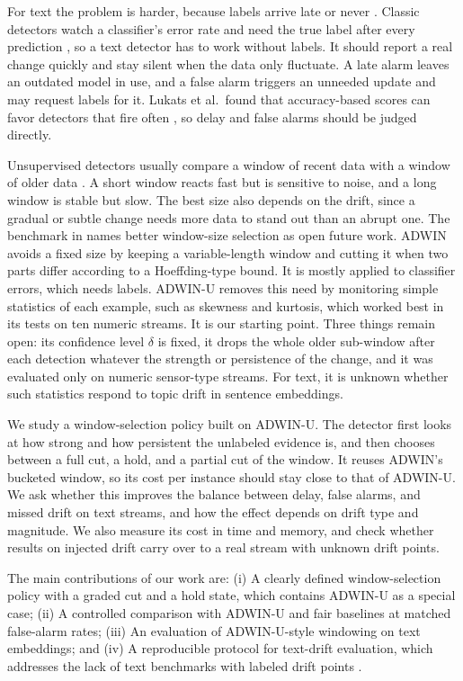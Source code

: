 \documentclass[conference]{IEEEtran}
\begin{document}
For text the problem is harder, because labels arrive late or never \cite{garcia2024review}. Classic detectors watch a classifier's error rate and need the true label after every prediction \cite{gama2004,bifet2007}, so a text detector has to work without labels. It should report a real change quickly and stay silent when the data only fluctuate. A late alarm leaves an outdated model in use, and a false alarm triggers an unneeded update and may request labels for it. Lukats et al.\ found that accuracy-based scores can favor detectors that fire often \cite{lukats2025}, so delay and false alarms should be judged directly.

Unsupervised detectors usually compare a window of recent data with a window of older data \cite{hinder2024a}. A short window reacts fast but is sensitive to noise, and a long window is stable but slow. The best size also depends on the drift, since a gradual or subtle change needs more data to stand out than an abrupt one. The benchmark in \cite{lukats2025} names better window-size selection as open future work.
ADWIN \cite{bifet2007} avoids a fixed size by keeping a variable-length window and cutting it when two parts differ according to a Hoeffding-type bound. It is mostly applied to classifier errors, which needs labels. ADWIN-U \cite{assis2025} removes this need by monitoring simple statistics of each example, such as skewness and kurtosis, which worked best in its tests on ten numeric streams. It is our starting point. Three things remain open: its confidence level $\delta$ is fixed, it drops the whole older sub-window after each detection whatever the strength or persistence of the change, and it was evaluated only on numeric sensor-type streams. For text, it is unknown whether such statistics respond to topic drift in sentence embeddings.

We study a window-selection policy built on ADWIN-U. The detector first looks at how strong and how persistent the unlabeled evidence is, and then chooses between a full cut, a hold, and a partial cut of the window. It reuses ADWIN's bucketed window, so its cost per instance should stay close to that of ADWIN-U. We ask whether this improves the balance between delay, false alarms, and missed drift on text streams, and how the effect depends on drift type and magnitude. We also measure its cost in time and memory, and check whether results on injected drift carry over to a real stream with unknown drift points.

The main contributions of our work are:
(i) A clearly defined window-selection policy with a graded cut and a hold state, which contains ADWIN-U as a special case;
(ii) A controlled comparison with ADWIN-U and fair baselines at matched false-alarm rates;
(iii) An evaluation of ADWIN-U-style windowing on text embeddings; and
(iv) A reproducible protocol for text-drift evaluation, which addresses the lack of text benchmarks with labeled drift points \cite{garcia2024review}.
\end{document}
